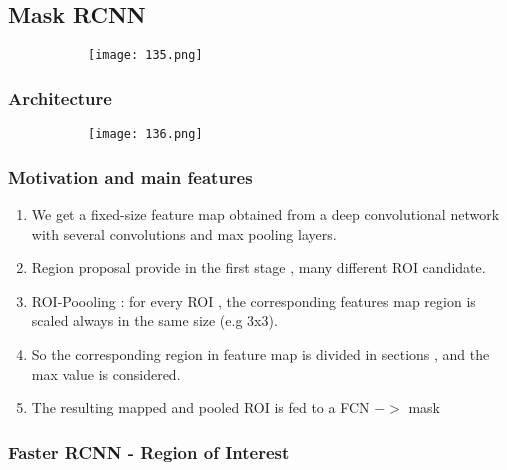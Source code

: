 \documentclass{article}
\begin{document}
\vspace{20mm}

\subsection{Mask RCNN}


\begin{figure}[ht!]
  \centering
  \begin{subfigure}[b]{0.4\linewidth}
    \texttt{[image: 135.png]}
  \end{subfigure}
\end{figure}

\subsubsection{Architecture}

\begin{figure}[ht!]
  \centering
  \begin{subfigure}[b]{0.9\linewidth}
    \texttt{[image: 136.png]}
  \end{subfigure}
\end{figure}

\subsubsection{Motivation and main features}

\begin{enumerate}
    \item We get a fixed-size feature map obtained from a deep convolutional network with several convolutions and max pooling layers.
    \item Region proposal provide in the first stage , many different ROI candidate.
    \item ROI-Poooling : for every ROI , the corresponding features map region is scaled always in the same size (e.g 3x3).
    \item So the corresponding region in feature map is divided in sections , and the max value is considered.
    \item The resulting mapped and pooled ROI is fed to a FCN $->$ mask
\end{enumerate}

\vspace{20mm}

\subsubsection{Faster RCNN - Region of Interest}
\end{document}
